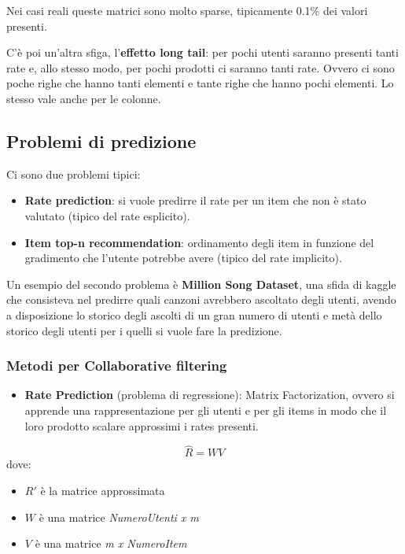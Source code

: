 Nei casi reali queste matrici sono molto sparse, tipicamente 0.1\% dei
valori presenti.

C'è poi un'altra sfiga, l'\textbf{effetto long tail}: per pochi utenti
saranno presenti tanti rate e, allo stesso modo, per pochi prodotti ci saranno tanti rate.
Ovvero ci sono poche righe che hanno tanti elementi e tante righe che
hanno pochi elementi. Lo stesso vale anche per le colonne.

\subsection{Problemi di predizione}\label{problemi-di-predizione}

Ci sono due problemi tipici:

\begin{itemize}
\tightlist
\item
  \textbf{Rate prediction}: si vuole predirre il rate per un item che
  non è stato valutato (tipico del rate esplicito).
\item
  \textbf{Item top-n recommendation}: ordinamento degli item in funzione
  del gradimento che l'utente potrebbe avere (tipico del rate implicito).
\end{itemize}

Un esempio del secondo problema è \textbf{Million Song Dataset}, una
sfida di kaggle che consisteva nel predirre quali canzoni avrebbero
ascoltato degli utenti, avendo a disposizione lo storico degli ascolti
di un gran numero di utenti e metà dello storico degli utenti per i
quelli si vuole fare la predizione.

\subsubsection{Metodi per Collaborative
filtering}\label{metodi-per-collaborative-filtering}

\begin{itemize}
\item
  \textbf{Rate Prediction} (problema di regressione): Matrix
  Factorization, ovvero si apprende una rappresentazione per gli utenti
  e per gli items in modo che il loro prodotto scalare approssimi i
  rates presenti.
\end{itemize}

$$
\hat{R} = W V
$$
dove:
\begin{itemize}
\item
  $R'$ è la matrice approssimata
\item
  $W$ è una matrice \textit{NumeroUtenti x m}
\item
  $V$ è una matrice \textit{m x NumeroItem}
\end{itemize}


